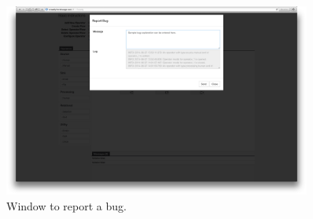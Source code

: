 \begin{figure}[ht]
	\centering
	\includegraphics[width=0.9\textwidth]{figures/tool/panel13.png}
	\caption{Window to report a bug.}
	\label{fig:panel13}
\end{figure}
